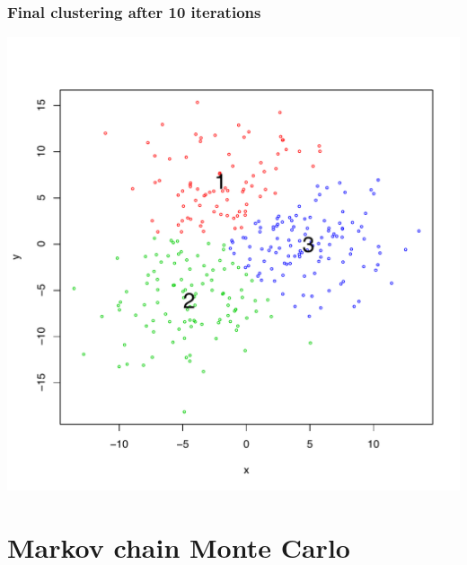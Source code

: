 \documentclass[handout]{beamer}
\numberwithin{equation}{section}
\begin{document}
\begin{frame}[fragile]
\frametitle{Final clustering after 10 iterations}
\begin{center}
\includegraphics[scale=.5]{../../fig/kmeans-after}
\end{center}
\end{frame}

\section{Markov chain Monte Carlo}
\end{document}
